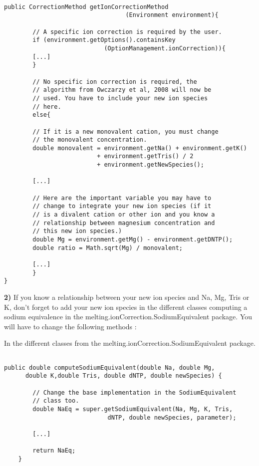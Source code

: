 \documentclass{article}
\begin{document}
\begin{verbatim}

public CorrectionMethod getIonCorrectionMethod
                                  (Environment environment){
		
		// A specific ion correction is required by the user.
		if (environment.getOptions().containsKey
		                    (OptionManagement.ionCorrection)){
		[...]
		}
		
		// No specific ion correction is required, the 
		// algorithm from Owczarzy et al, 2008 will now be 
		// used. You have to include your new ion species
		// here.
		else{
		
		// If it is a new monovalent cation, you must change 
		// the monovalent concentration.
		double monovalent = environment.getNa() + environment.getK() 
		                  + environment.getTris() / 2
		                  + environment.getNewSpecies();
		
		[...]
		
		// Here are the important variable you may have to 
		// change to integrate your new ion species (if it 
		// is a divalent cation or other ion and you know a 
		// relationship between magnesium concentration and 
		// this new ion species.)
		double Mg = environment.getMg() - environment.getDNTP();
		double ratio = Math.sqrt(Mg) / monovalent;
		
		[...]
		}
}

\end{verbatim}


\textbf{2)} If you know a relationship between your new ion species and Na, Mg, Tris or K, don't forget
to add your new ion species in the different classes computing a sodium equivalence in the
melting.ionCorrection.SodiumEquivalent package.
You will have to change the following methods :

In the different classes from the melting.ionCorrection.SodiumEquivalent package.
\begin{verbatim}

public double computeSodiumEquivalent(double Na, double Mg, 
      double K,double Tris, double dNTP, double newSpecies) {
		
		// Change the base implementation in the SodiumEquivalent 
		// class too.
		double NaEq = super.getSodiumEquivalent(Na, Mg, K, Tris, 
		                     dNTP, double newSpecies, parameter);

		[...]

		return NaEq;
	}

\end{verbatim}
\end{document}
